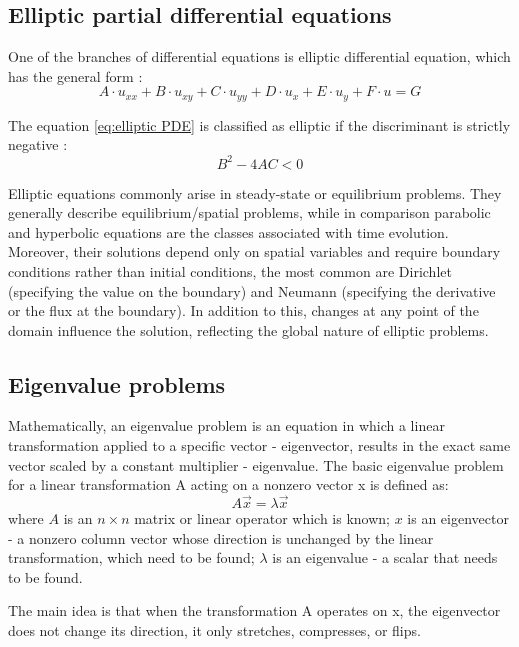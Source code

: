 \documentclass[conference]{IEEEtran}
\begin{document}
\subsection{Elliptic partial differential equations}
One of the branches of differential equations is elliptic differential equation, which has the general form \cite{b0}:
\begin{equation}
    A\cdot u_{xx} + B\cdot u_{xy} + C\cdot u_{yy} + D\cdot u_{x} + E\cdot u_{y} + F\cdot u = G
    \label{eq:elliptic PDE}
\end{equation}

The equation \ref{eq:elliptic PDE} is classified as elliptic if the discriminant is strictly negative \cite{b0}:
\begin{equation}
    B^2 - 4AC < 0
\end{equation}

Elliptic equations commonly arise in steady-state or equilibrium problems. They generally describe equilibrium/spatial problems, while in comparison parabolic and hyperbolic equations are the classes associated with time evolution.
Moreover, their solutions depend only on spatial variables and require boundary conditions rather than initial conditions, the most common are Dirichlet (specifying the value on the boundary) and Neumann (specifying the derivative or the flux at the boundary). 
In addition to this, changes at any point of the domain influence the solution, reflecting the global nature of elliptic problems.


\subsection{Eigenvalue problems}
Mathematically, an eigenvalue problem is an equation in which a linear transformation applied to a specific vector - eigenvector, results in the exact same vector scaled by a constant multiplier - eigenvalue. 
The basic eigenvalue problem for a linear transformation A acting on a nonzero vector x is defined as:
\begin{equation}
    A\vec{x} = \lambda\vec{x}
\end{equation}
where $A$ is an $n \times n$ matrix or linear operator which is known; $x$ is an eigenvector - a nonzero column vector whose direction is unchanged by the linear transformation, which need to be found; $\lambda$ is an eigenvalue - a scalar that needs to be found.

The main idea is that when the transformation A operates on x, the eigenvector does not change its direction, it only stretches, compresses, or flips.
\end{document}
